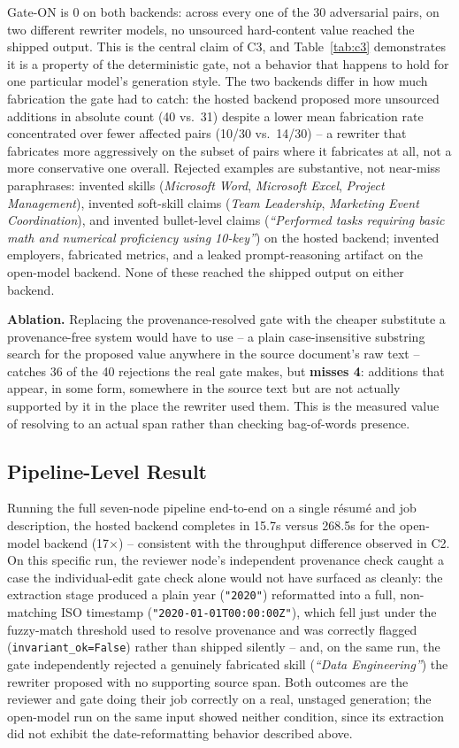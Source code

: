 \documentclass{article}
\begin{document}
Gate-ON is 0 on both backends: across every one of the 30 adversarial pairs, on two different
rewriter models, no unsourced hard-content value reached the shipped output. This is the central
claim of C3, and Table~\ref{tab:c3} demonstrates it is a property of the deterministic gate, not a
behavior that happens to hold for one particular model's generation style. The two backends differ
in how much fabrication the gate had to catch: the hosted backend proposed more unsourced additions
in absolute count (40 vs.\ 31) despite a lower mean fabrication rate concentrated over fewer
affected pairs (10/30 vs.\ 14/30) -- a rewriter that fabricates more aggressively on the subset of
pairs where it fabricates at all, not a more conservative one overall. Rejected examples are
substantive, not near-miss paraphrases: invented skills (\emph{Microsoft Word}, \emph{Microsoft
Excel}, \emph{Project Management}), invented soft-skill claims (\emph{Team Leadership},
\emph{Marketing Event Coordination}), and invented bullet-level claims (\emph{``Performed tasks
requiring basic math and numerical proficiency using 10-key''}) on the hosted backend; invented
employers, fabricated metrics, and a leaked prompt-reasoning artifact on the open-model backend.
None of these reached the shipped output on either backend.

\textbf{Ablation.} Replacing the provenance-resolved gate with the cheaper substitute a
provenance-free system would have to use -- a plain case-insensitive substring search for the
proposed value anywhere in the source document's raw text -- catches 36 of the 40 rejections the
real gate makes, but \textbf{misses 4}: additions that appear, in some form, somewhere in the
source text but are not actually supported by it in the place the rewriter used them. This is the
measured value of resolving to an actual span rather than checking bag-of-words presence.

\subsection{Pipeline-Level Result}

Running the full seven-node pipeline end-to-end on a single résumé and job description, the hosted
backend completes in 15.7s versus 268.5s for the open-model backend (17$\times$) -- consistent with
the throughput difference observed in C2. On this specific run, the reviewer node's independent
provenance check caught a case the individual-edit gate check alone would not have surfaced as
cleanly: the extraction stage produced a plain year (\texttt{"2020"}) reformatted into a full,
non-matching ISO timestamp (\texttt{"2020-01-01T00:00:00Z"}), which fell just under the
fuzzy-match threshold used to resolve provenance and was correctly flagged
(\texttt{invariant\_ok=False}) rather than shipped silently -- and, on the same run, the gate
independently rejected a genuinely fabricated skill (\emph{``Data Engineering''}) the rewriter
proposed with no supporting source span. Both outcomes are the reviewer and gate doing their job
correctly on a real, unstaged generation; the open-model run on the same input showed neither
condition, since its extraction did not exhibit the date-reformatting behavior described above.
\end{document}
